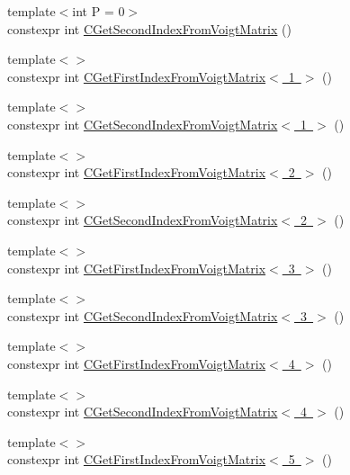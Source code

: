 \begin{DoxyCompactItemize}
{\footnotesize template$<$int P = 0$>$ }\\constexpr int \mbox{\hyperlink{namespacempc_1_1utilities_a094a324d81b996e8397336286264dfcd}{C\+Get\+Second\+Index\+From\+Voigt\+Matrix}} ()
\item 
{\footnotesize template$<$$>$ }\\constexpr int \mbox{\hyperlink{namespacempc_1_1utilities_a9d279abaf7dfef3e9192f7b778eb68fa}{C\+Get\+First\+Index\+From\+Voigt\+Matrix$<$ 1 $>$}} ()
\item 
{\footnotesize template$<$$>$ }\\constexpr int \mbox{\hyperlink{namespacempc_1_1utilities_ac600a3a4e8be50854214d495b7672444}{C\+Get\+Second\+Index\+From\+Voigt\+Matrix$<$ 1 $>$}} ()
\item 
{\footnotesize template$<$$>$ }\\constexpr int \mbox{\hyperlink{namespacempc_1_1utilities_a9c173e2ecba984e738a4a21047fc78f7}{C\+Get\+First\+Index\+From\+Voigt\+Matrix$<$ 2 $>$}} ()
\item 
{\footnotesize template$<$$>$ }\\constexpr int \mbox{\hyperlink{namespacempc_1_1utilities_ace2b5aa12b0c53dfb13b277172f636d3}{C\+Get\+Second\+Index\+From\+Voigt\+Matrix$<$ 2 $>$}} ()
\item 
{\footnotesize template$<$$>$ }\\constexpr int \mbox{\hyperlink{namespacempc_1_1utilities_a80545c6ddda43d5f72754d0f18ec42fc}{C\+Get\+First\+Index\+From\+Voigt\+Matrix$<$ 3 $>$}} ()
\item 
{\footnotesize template$<$$>$ }\\constexpr int \mbox{\hyperlink{namespacempc_1_1utilities_a1ab261832775728a8dd9aec99a9b8255}{C\+Get\+Second\+Index\+From\+Voigt\+Matrix$<$ 3 $>$}} ()
\item 
{\footnotesize template$<$$>$ }\\constexpr int \mbox{\hyperlink{namespacempc_1_1utilities_a9cc9cf00e8b46c7b4089290a9801dab8}{C\+Get\+First\+Index\+From\+Voigt\+Matrix$<$ 4 $>$}} ()
\item 
{\footnotesize template$<$$>$ }\\constexpr int \mbox{\hyperlink{namespacempc_1_1utilities_a2e002bb3ea9c528659336d38b86cbaf8}{C\+Get\+Second\+Index\+From\+Voigt\+Matrix$<$ 4 $>$}} ()
\item 
{\footnotesize template$<$$>$ }\\constexpr int \mbox{\hyperlink{namespacempc_1_1utilities_a84defb8639ca919a8620092ce15ffd4c}{C\+Get\+First\+Index\+From\+Voigt\+Matrix$<$ 5 $>$}} ()

\end{DoxyCompactItemize}
